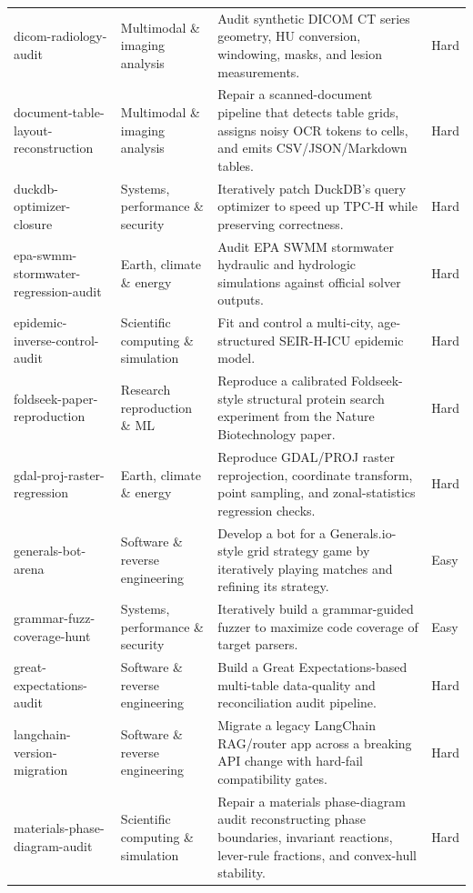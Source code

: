 \begin{longtable}{p{}p{}p{}p{}}
dicom-radiology-audit & Multimodal \& imaging analysis & Audit synthetic DICOM CT series geometry, HU conversion, windowing, masks, and lesion measurements. & Hard \\
document-table-layout-reconstruction & Multimodal \& imaging analysis & Repair a scanned-document pipeline that detects table grids, assigns noisy OCR tokens to cells, and emits CSV/JSON/Markdown tables. & Hard \\
duckdb-optimizer-closure & Systems, performance \& security & Iteratively patch DuckDB's query optimizer to speed up TPC-H while preserving correctness. & Hard \\
epa-swmm-stormwater-regression-audit & Earth, climate \& energy & Audit EPA SWMM stormwater hydraulic and hydrologic simulations against official solver outputs. & Hard \\
epidemic-inverse-control-audit & Scientific computing \& simulation & Fit and control a multi-city, age-structured SEIR-H-ICU epidemic model. & Hard \\
foldseek-paper-reproduction & Research reproduction \& ML & Reproduce a calibrated Foldseek-style structural protein search experiment from the Nature Biotechnology paper. & Hard \\
gdal-proj-raster-regression & Earth, climate \& energy & Reproduce GDAL/PROJ raster reprojection, coordinate transform, point sampling, and zonal-statistics regression checks. & Hard \\
generals-bot-arena & Software \& reverse engineering & Develop a bot for a Generals.io-style grid strategy game by iteratively playing matches and refining its strategy. & Easy \\
grammar-fuzz-coverage-hunt & Systems, performance \& security & Iteratively build a grammar-guided fuzzer to maximize code coverage of target parsers. & Easy \\
great-expectations-audit & Software \& reverse engineering & Build a Great Expectations-based multi-table data-quality and reconciliation audit pipeline. & Hard \\
langchain-version-migration & Software \& reverse engineering & Migrate a legacy LangChain RAG/router app across a breaking API change with hard-fail compatibility gates. & Hard \\
materials-phase-diagram-audit & Scientific computing \& simulation & Repair a materials phase-diagram audit reconstructing phase boundaries, invariant reactions, lever-rule fractions, and convex-hull stability. & Hard \\

\end{longtable}
